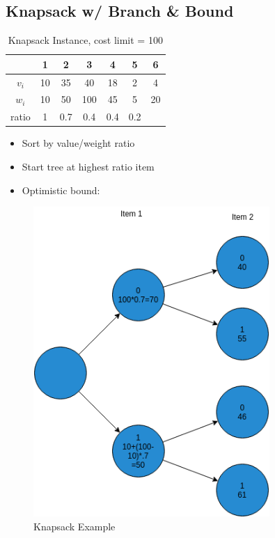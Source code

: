 \documentclass[12pt, letter]{article}
\begin{document}
\subsection*{Knapsack w/ Branch \& Bound}
\begin{table}[h]
	\centering
	\caption{Knapsack Instance, cost limit = 100}
	\label{tab:label}
	\begin{tabular}{|c|c|c|c|c|c|c|}
	\hline
	 & 1 & 2 & 3 & 4 & 5 & 6 \\
	\hline
	$v_i$ & 10 & 35 & 40 & 18 & 2 & 4 \\
	\hline
	$w_i$ & 10 & 50 & 100 & 45 & 5 & 20 \\
	\hline
	ratio & 1 & 0.7 & 0.4 & 0.4 & 0.2 \\
	\end{tabular}
\end{table}
\begin{itemize}
	\item Sort by value/weight ratio
	\item Start tree at highest ratio item
	\item Optimistic bound: 
\end{itemize}
\begin{figure}[h]
	\centering
	\includegraphics[width=0.8\textwidth]{knapsack}
	\caption{Knapsack Example}
	\label{fig:knapsack}
\end{figure}
\end{document}

